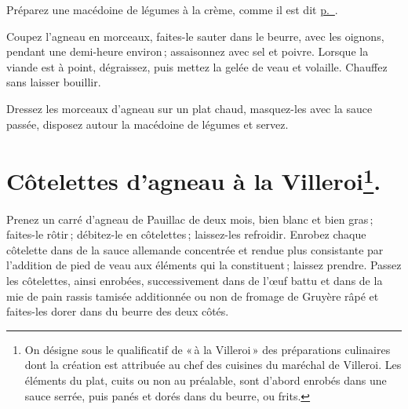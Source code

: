 Préparez une macédoine de légumes à la crème, comme il est dit \hyperlink{p0773}{p. \pageref{pg0773}}.

Coupez l'agneau en morceaux, faites-le sauter dans le beurre, avec les oignons,
pendant une demi-heure environ ; assaisonnez avec sel et poivre. Lorsque la
viande est à point, dégraissez, puis mettez la gelée de veau et volaille.
Chauffez sans laisser bouillir.

Dressez les morceaux d'agneau sur un plat chaud, masquez-les avec la sauce
passée, disposez autour la macédoine de légumes et servez.


\section*{\centering Côtelettes d'agneau à la Villeroi\footnote{On désigne sous le qualificatif de
                                                                « à la Villeroi » des préparations
                                                                culinaires dont la création est
                                                                attribuée au chef des cuisines du
                                                                maréchal de Villeroi.
                                                                \protect\endgraf
                                                                Les éléments du plat, cuits ou non
                                                                au préalable, sont d'abord enrobés
                                                                dans une sauce serrée, puis panés et
                                                                dorés dans du beurre, ou frits.}.}
{}

Prenez un carré d'agneau de Pauillac de deux mois, bien blanc et bien gras ;
faites-le rôtir ; débitez-le en côtelettes ; laissez-les refroidir. Enrobez
chaque côtelette dans de la sauce allemande concentrée et rendue plus
consistante par l'addition de pied de veau aux éléments qui la constituent ;
laissez prendre. Passez les côtelettes, ainsi enrobées, successivement dans de
l'œuf battu et dans de la mie de pain rassis tamisée additionnée ou non de
fromage de Gruyère râpé et faites-les dorer dans du beurre des deux côtés.

